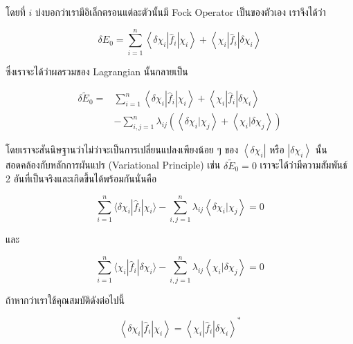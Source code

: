 \noindent โดยที่ $i$ บ่งบอกว่าเรามีอิเล็กตรอนแต่ละตัวนั้นมี Fock Operator เป็นของตัวเอง เราจึงได้ว่า

\begin{equation}
    \delta E_0 
    = \sum_{i=1}^n\left\langle\delta \chi_i\left|\hat{f}_i\right| \chi_i\right\rangle
    + \left\langle\chi_i\left|\hat{f}_i\right| \delta \chi_i\right\rangle
\end{equation}

\noindent ซึ่งเราจะได้ว่าผลรวมของ Lagrangian นั้นกลายเป็น

\begin{equation}
    \begin{aligned}
        \delta \tilde{E}_0 
        = & \sum_{i=1}^n\left\langle\delta \chi_i\left|\hat{f}_i\right| \chi_i\right\rangle
            +\left\langle\chi_i\left|\hat{f}_i\right| \delta \chi_i\right\rangle \\
        & -\sum_{i, j=1}^n \lambda_{i j}\left(\left\langle\delta \chi_i | \chi_j\right\rangle
            + \left\langle\chi_i | \delta \chi_j\right\rangle\right)
    \end{aligned}
\end{equation}

\noindent โดยเราจะสันนิษฐานว่าไม่ว่าจะเป็นการเปลี่ยนแปลงเพียงน้อย ๆ ของ $\left\langle\delta \chi_i\right|$ หรือ 
$\left|\delta \chi_i\right\rangle$ นั้นสอดคล้องกับหลักการผันแปร (Variational Principle) เช่น $\delta \tilde{E}_0=0$
เราจะได้ว่ามีความสัมพันธ์ 2 อันที่เป็นจริงและเกิดขึ้นได้พร้อมกันนั่นคือ

\begin{equation}
    \label{eq:small_variation_relation_1}
    \sum_{i=1}^n \langle\delta \chi_i | \hat{f}_i | \chi_i \rangle 
        - \sum_{i, j=1}^n \lambda_{i j}\left\langle\delta \chi_i | \chi_j\right\rangle 
    = 0
\end{equation}

\noindent และ

\begin{equation}
    \label{eq:small_variation_relation_2}
    \sum_{i=1}^n \langle\chi_i | \hat{f}_i | \delta \chi_i \rangle 
        - \sum_{i, j=1}^n \lambda_{i j}\left\langle\chi_i | \delta \chi_j\right\rangle 
    = 0
\end{equation}

ถ้าหากว่าเราใช้คุณสมบัติดังต่อไปนี้

\begin{equation}
    \left\langle\delta \chi_i\left|\hat{f}_i\right| \chi_i\right\rangle 
    = 
    \left\langle\chi_i\left|\hat{f}_i\right| \delta \chi_i\right\rangle^*
\end{equation}

